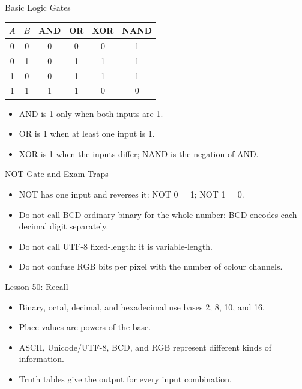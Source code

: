 \documentclass[aspectratio=169]{beamer}
\begin{document}
\begin{frame}{Basic Logic Gates}
  \begin{center}
    \begin{tabular}{cc|cccc}
      \toprule
      $A$ & $B$ & AND & OR & XOR & NAND \\
      \midrule
      0 & 0 & 0 & 0 & 0 & 1 \\
      0 & 1 & 0 & 1 & 1 & 1 \\
      1 & 0 & 0 & 1 & 1 & 1 \\
      1 & 1 & 1 & 1 & 0 & 0 \\
      \bottomrule
    \end{tabular}
  \end{center}
  \vspace{0.25cm}
  \begin{itemize}
    \item AND is 1 only when both inputs are 1.
    \item OR is 1 when at least one input is 1.
    \item XOR is 1 when the inputs differ; NAND is the negation of AND.
  \end{itemize}
\end{frame}

\begin{frame}{NOT Gate and Exam Traps}
  \begin{itemize}
    \item NOT has one input and reverses it: NOT 0 = 1; NOT 1 = 0.
    \item Do not call BCD ordinary binary for the whole number: BCD encodes
      each decimal digit separately.
    \item Do not call UTF-8 fixed-length: it is variable-length.
    \item Do not confuse RGB bits per pixel with the number of colour
      channels.
  \end{itemize}
\end{frame}

\begin{frame}{Lesson 50: Recall}
  \begin{itemize}
    \item Binary, octal, decimal, and hexadecimal use bases 2, 8, 10, and 16.
    \item Place values are powers of the base.
    \item ASCII, Unicode/UTF-8, BCD, and RGB represent different kinds of
      information.
    \item Truth tables give the output for every input combination.
  \end{itemize}
\end{frame}
\end{document}
